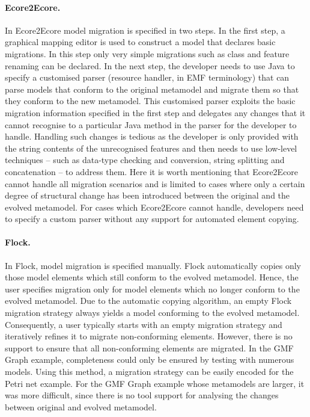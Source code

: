 \paragraph{Ecore2Ecore.} In Ecore2Ecore model migration is specified in two steps. In the first step, a graphical mapping editor is used to construct a model that declares basic migrations. In this step only very simple migrations such as class and feature renaming can be declared. In the next step, the developer needs to use Java to specify a customised parser (resource handler, in EMF terminology) that can parse models that conform to the original metamodel and migrate them so that they conform to the new metamodel. This customised parser exploits the basic migration information specified in the first step and delegates any changes that it cannot recognise to a particular Java method in the parser for the developer to handle. Handling such changes is tedious as the developer is only provided with the string contents of the unrecognised features and then needs to use low-level techniques -- such as data-type checking and conversion, string splitting and concatenation -- to address them. Here it is worth mentioning that Ecore2Ecore cannot handle all migration scenarios and is limited to cases where only a certain degree of structural change has been introduced between the original and the evolved metamodel. For cases which Ecore2Ecore cannot handle, developers need to specify a custom parser without any support for automated element copying.

\paragraph{Flock.} In Flock, model migration is specified manually. Flock automatically copies only those model elements which still conform to the evolved metamodel. Hence, the user specifies migration only for model elements which no longer conform to the evolved metamodel.
%
Due to the automatic copying algorithm, an empty Flock migration strategy always yields a model conforming to the evolved metamodel. Consequently, a user typically starts with an empty migration strategy and iteratively refines it to migrate non-conforming elements. However, there is no support to ensure that all non-conforming elements are migrated. In the GMF Graph example, completeness could only be ensured by testing with numerous models.
%
Using this method, a migration strategy can be easily encoded for the Petri net example. For the GMF Graph example whose metamodels are larger, it was more difficult, since there is no tool support for analysing the changes between original and evolved metamodel. %

